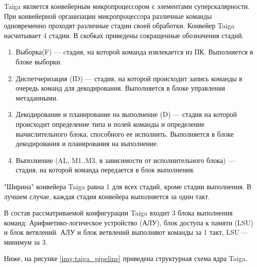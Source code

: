 Taiga является конвейерным микропроцессором с элементами суперскалярности. При конвейерной организации микропроцессора различные команды одновременно проходят различные стадии своей обработки. Конвейер Taiga насчитывает 4 стадии. В скобках приведены сокращенные обозначения стадий.

\begin{enumerate}
	\item Выборка(F) --- cтадия, на которой команда извлекается из ПК. Выполняется в блоке выборки.

	\item Диспетчеризация (ID) --- стадия, на которой происходит запись команды в очередь команд для декодирования. Выполняется в блоке управления метаданными.

	\item Декодирование и планирование на выполнение (D) --- стадия на которой происходит определение типа и полей команды и определение вычислительного блока, способного ее исполнить. Выполняется в блоке декодирования и планирования на выполнение.

	\item Выполнение (AL, M1..M3, в зависимости от исполнительного блока) --- стадия, на которой команда передается в блок выполнения.	
\end{enumerate}

"Ширина" конвейера Taiga равна 1 для всех стадий, кроме стадии выполнения. В лучшем случае, каждая стадия конвейера выполняется за один такт.

В состав рассматриваемой конфигурации Taiga входит 3 блока выполнения команд:
Арифметико-логическое устройство (АЛУ), блок доступа к памяти (LSU) и блок ветвлений.
АЛУ и блок ветвлений выполняют команды за 1 такт, LSU — минимум за 3. 

Ниже, на рисунке \ref{img:taiga_pipeline} приведена структурная схема ядра Taiga.

